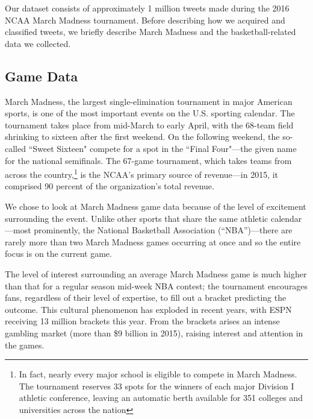 \documentclass[12pt]{article}
\begin{document}
\begin{doublespacing}
Our dataset consists of approximately 1 million tweets made during the 2016 NCAA March Madness tournament. Before describing how we acquired and classified tweets, we briefly describe March Madness and the basketball-related data we collected. 

\subsection{Game Data}

March Madness, the largest single-elimination tournament in major American sports, is one of the most important events on the U.S. sporting calendar. The tournament takes place from mid-March to early April, with the 68-team field shrinking to sixteen after the first weekend. On the following weekend, the so-called ``Sweet Sixteen" compete for a spot in the ``Final Four"---the given name for the national semifinals. The 67-game tournament, which takes teams from across the country,\footnote{In fact, nearly every major school is eligible to compete in March Madness. The tournament reserves 33 spots for the winners of each major Division I athletic conference, leaving an automatic berth available for 351 colleges and universities across the nation} is the NCAA's primary source of revenue---in 2015, it comprised 90 percent of the organization's total revenue. 

We chose to look at March Madness game data because of the level of excitement surrounding the event. Unlike other sports that share the same athletic calendar---most prominently, the National Basketball Association (``NBA'')---there are rarely more than two March Madness games occurring at once and so the entire focus is on the current game. 

The level of interest surrounding an average March Madness game is much higher than that for a regular season mid-week NBA contest; the tournament encourages fans, regardless of their level of expertise, to fill out a bracket predicting the outcome. This cultural phenomenon has exploded in recent years, with ESPN receiving 13 million brackets this year. From the brackets arises an intense gambling market (more than \$9 billion in 2015), raising interest and attention in the games. 


\end{doublespacing}
\end{document}
